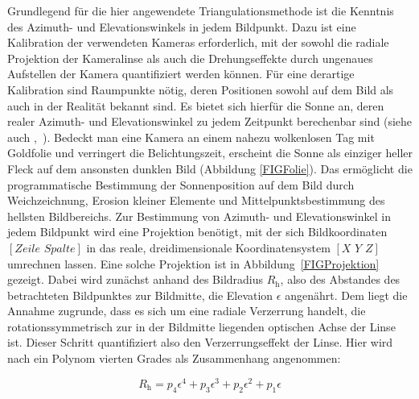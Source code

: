 \documentclass[a4paper,11pt,twoside,german]{article}
\newcommand{\absatz}{\smallbreak} %
\begin{document}
Grundlegend für die hier angewendete Triangulationsmethode ist die Kenntnis des
Azimuth- und Elevationswinkels in jedem Bildpunkt. Dazu ist eine Kalibration der
verwendeten Kameras erforderlich, mit der sowohl die radiale Projektion der
Kameralinse als auch die Drehungseffekte durch ungenaues Aufstellen der Kamera
quantifiziert werden können. Für eine derartige Kalibration sind Raumpunkte
nötig, deren Positionen sowohl auf dem Bild als auch in der Realität bekannt
sind. Es bietet sich hierfür die Sonne an, deren realer Azimuth- und
Elevationswinkel zu jedem Zeitpunkt berechenbar sind (siehe auch
\mbox{\citeauthor{pysolar}, \citeyear{pysolar}}).
\absatz
Bedeckt man eine Kamera an einem nahezu wolkenlosen Tag mit Goldfolie und
verringert die Belichtungszeit, erscheint die Sonne als einziger heller Fleck
auf dem ansonsten dunklen Bild (Abbildung \ref{FIGFolie}).  Das ermöglicht die
programmatische Bestimmung der Sonnenposition auf dem Bild durch Weichzeichnung,
Erosion kleiner Elemente und Mittelpunktsbestimmung des hellsten Bildbereichs.
\absatz
Zur Bestimmung von Azimuth- und Elevationswinkel in jedem Bildpunkt wird eine
Projektion benötigt, mit der sich Bildkoordinaten $\left[Zeile \,\,
Spalte\right]$ in das reale, dreidimensionale Koordinatensystem
$\left[X\,\,Y\,\,Z\right]$ umrechnen lassen. Eine solche Projektion ist
in Abbildung~\ref{FIGProjektion} gezeigt. Dabei wird zunächst anhand des
Bildradius $R_\mathrm{h}$, also des Abstandes des betrachteten Bildpunktes zur
Bildmitte, die Elevation $\epsilon$ angenährt. Dem liegt die Annahme zugrunde,
dass es sich um eine radiale Verzerrung handelt, die rotationssymmetrisch zur in
der Bildmitte liegenden optischen Achse der Linse ist.  Dieser Schritt
quantifiziert also den Verzerrungseffekt der Linse. Hier wird nach \cite{ingo} ein
Polynom vierten Grades als
Zusammenhang angenommen:

\begin{equation}
\label{GLRadial}
R_\mathrm{h} = p_4 \epsilon ^ 4 + p_3 \epsilon ^ 3 + p_2 \epsilon ^ 2 + p_1
\epsilon 
\end{equation}
\end{document}
